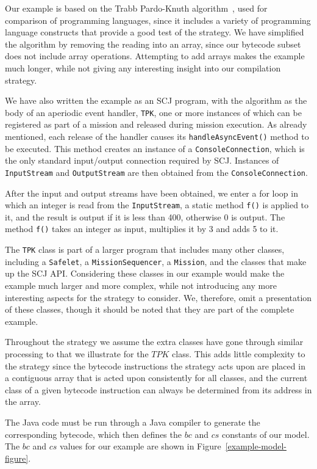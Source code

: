 Our example is based on the Trabb Pardo-Knuth
algorithm~\cite{knuth1980}, used for comparison of programming
languages, since it includes a variety of programming language
constructs that provide a good test of the strategy.
We have simplified the algorithm by removing the reading into an
array, since our bytecode subset does not include array operations.
Attempting to add arrays makes the example much longer, while not
giving any interesting insight into our compilation strategy.

We have also written the example as an SCJ program, with the algorithm
as the body of an aperiodic event handler, \texttt{TPK}, one or more
instances of which can be registered as part of a mission and released
during mission execution.
As already mentioned, each release of the handler causes its
\texttt{handleAsyncEvent()} method to be executed.
This method creates an instance of a \texttt{ConsoleConnection}, which
is the only standard input/output connection required by SCJ.
Instances of \texttt{InputStream} and \texttt{OutputStream} are then
obtained from the \texttt{ConsoleConnection}.

After the input and output streams have been obtained, we enter a for
loop in which an integer is read from the \texttt{InputStream}, a
static method \texttt{f()} is applied to it, and the result is output
if it is less than 400, otherwise 0 is output.
The method \texttt{f()} takes an integer as input, multiplies it by 3
and adds 5 to it.

The \texttt{TPK} class is part of a larger program that includes many
other classes, including a \texttt{Safelet}, a
\texttt{MissionSequencer}, a \texttt{Mission}, and the classes that
make up the SCJ API.
Considering these classes in our example would make the example much
larger and more complex, while not introducing any more interesting
aspects for the strategy to consider.
We, therefore, omit a presentation of these classes, though it should be
noted that they are part of the complete example.

Throughout the strategy we assume the extra classes have gone through
similar processing to that we illustrate for the $TPK$ class.
This adds little complexity to the strategy since the bytecode
instructions the strategy acts upon are placed in a contiguous array
that is acted upon consistently for all classes, and the current class
of a given bytecode instruction can always be determined from its
address in the array.

The Java code must be run through a Java compiler to generate the
corresponding bytecode, which then defines the $bc$ and $cs$ constants
of our model.
The $bc$ and $cs$ values for our example are shown in
Figure~\ref{example-model-figure}.


